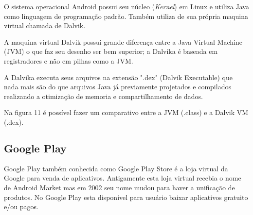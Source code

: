 O sistema operacional Android possui seu núcleo (\textit{Kernel}) em Linux e utiliza Java como linguagem de programação padrão. Também utiliza de sua própria maquina virtual chamada de Dalvik.

A maquina virtual Dalvik possui grande diferença entre a Java Virtual Machine (JVM) o que faz seu desenho ser bem superior; a Dalvika é baseada em registradores e não em pilhas como a JVM.

A Dalvika executa seus arquivos na extensão ".dex" (Dalvik Executable) que nada mais são do que arquivos Java já previamente projetados e compilados realizando a otimização de memoria e compartilhamento de dados.

Na figura 11 é possível fazer um comparativo entre a JVM (.class) e a Dalvik VM (.dex). \cite{desa}

\pagebreak
\begin{figure}[h!]
		\centering
	\end{figure}

\subsection{Google Play }

Google Play também conhecida como Google Play Store é a loja virtual da Google para venda de aplicativos. Antigamente esta loja virtual recebia o nome de Android Market mas em 2002 seu nome mudou para haver a unificação de produtos.
No Google Play esta disponível para usuário baixar aplicativos gratuito e/ou pagos. \cite{gp}

